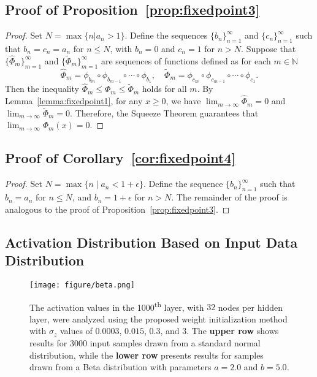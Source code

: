 \documentclass{article} \usepackage{iclr2025_conference,times}
\begin{document}
\subsection{Proof of Proposition~\ref{prop:fixedpoint3}}\label{proposition_proof}
\begin{proof}
Set $N = \max\{n| a_n >1\}$. Define the sequences $\{b_n\}_{n=1}^\infty$ and $\{c_n\}_{n=1}^\infty$ such that $b_n = c_n = a_n$ for $n \leq N$, with $b_n = 0$ and $c_n = 1$ for $n > N$.
Suppose that $\{\hat{\Phi}_m\}_{m=1}^\infty$ and $\{\tilde{\Phi}_m\}_{m=1}^\infty$ are sequences of functions defined as for each $m \in \mathbb{N}$
\[
\hat{\Phi}_m = \phi_{b_m} \circ \phi_{b_{m-1}} \circ \cdots \circ \phi_{b_1}, \quad \tilde{\Phi}_m = \phi_{c_m} \circ \phi_{c_{m-1}} \circ \cdots \circ \phi_{c_1}.
\]
Then the inequality $\hat{\Phi}_m \leq  \Phi_m \leq \tilde{\Phi}_m$ holds for all $m$.
By Lemma~\ref{lemma:fixedpoint1}, for any $x\geq 0$, we have $\lim_{m \to \infty} \hat{\Phi}_m = 0$ and $\lim_{m \to \infty} \tilde{\Phi}_m = 0$. Therefore, the Squeeze Theorem guarantees that $\lim_{m \to \infty} \Phi_m(x) = 0$. 
\end{proof}

\subsection{Proof of Corollary~\ref{cor:fixedpoint4}}\label{cor_proof}
\begin{proof}
Set $N = \max\{n \mid a_n < 1 + \epsilon\}$. Define the sequence $\{b_n\}_{n=1}^\infty$ such that $b_n = a_n$ for $n \leq N$, and $b_n = 1 + \epsilon$ for $n > N$. The remainder of the proof is analogous to the proof of Proposition~\ref{prop:fixedpoint3}.
\end{proof}
\newpage
\subsection{Activation Distribution Based on Input Data Distribution}\label{app1123}
\begin{figure}[h!]
\centering
\texttt{[image: figure/beta.png]}

\caption{The activation values in the 1000\textsuperscript{th} layer, with $32$ nodes per hidden layer, were analyzed using the proposed weight initialization method with $\sigma_z$ values of $0.0003$, $0.015$, $0.3$, and $3$. The \textbf{upper row} shows results for $3000$ input samples drawn from a standard normal distribution, while the \textbf{lower row} presents results for samples drawn from a Beta distribution with parameters $a=2.0$ and $b=5.0$.}
\label{std_uniform}
\end{figure}
\end{document}
